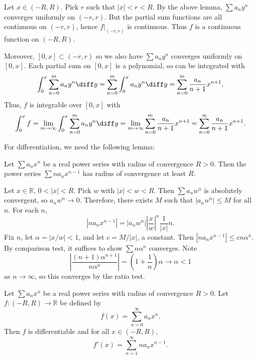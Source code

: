 \documentclass[12pt]{article}
\begin{document}
\begin{proofbox}
	Let $x \in (-R, R)$. Pick $r$ such that $|x| < r < R$. By the above lemma, $\sum a_n y^{n}$ converges uniformly on $(-r, r)$. But the partial sum functions are all continuous on $(-r, r)$, hence $f|_{(-r, r)}$ is continuous. Thus $f$ is a continuous function on $(-R, R)$.

	Moreover, $[0, x] \subset (-r, r)$ so we also have $\sum a_n y^{n}$ converges uniformly on $[0, x]$. Each partial sum on $[0, x]$ is a polynomial, so can be integrated with
	\[
		\int_{0}^{x} \sum_{n = 0}^{m} a_ny^{n}\diff y = \sum_{n = 0}^{m} \int_{0}^{x} a_n y^{n}\diff y = \sum_{n = 0}^{m} \frac{a_n}{n+1}x^{n+1}
	.\]
	Thus, $f$ is integrable over $[0, x]$ with
	\begin{align*}
		\int_{0}^{x} f = \lim_{m \to \infty}\int_{0}^{x} \sum_{n = 0}^{m} a_n y^{n}\diff y = \lim_{m \to \infty} \sum_{n = 0}^{m} \frac{a_n}{n+1}x^{n+1} = \sum_{n = 0}^{\infty} \frac{a_n}{n+1}x^{n+1}.
	\end{align*}
\end{proofbox}

For differentiation, we need the following lemma:

\begin{lemma}
	Let $\sum a_n x^{n}$ be a real power series with radius of convergence $R > 0$. Then the power series $\sum n a_n x^{n-1}$ has radius of convergence at least $R$.
\end{lemma}

\begin{proofbox}
	Let $x \in \mathbb{R}$, $0 < |x| < R$. Pick $w$ with $|x| < w < R$. Then $\sum a_n w^{n}$ is absolutely convergent, so $a_n w^{n} \to 0$. Therefore, there exists $M$ such that $|a_n w^{n}| \leq M$ for all $n$. For each $n$,
\[
|na_n x^{n-1}| = |a_n w^{n}| \left| \frac{x}{w} \right|^{n} \frac{1}{|x|}n
.\]
Fix $n$, let $\alpha = |x/w| < 1$, and let $c = M/|x|$, a constant. Then $|n a_n x^{n-1}| \leq c n \alpha^{n}$. By comparison test, it suffices to show $\sum n \alpha^{n}$ converges. Note
\[
	\left| \frac{(n+1)\alpha^{n+1}}{n \alpha^{n}} \right| = \left(1 + \frac{1}{n} \right) \alpha \to \alpha < 1
\]
as $n \to \infty$, so this converges by the ratio test.
\end{proofbox}


\begin{theorem}
	Let $\sum a_n x^{n}$ be a real power series with radius of convergence $R > 0$. Let $f : (-R, R) \to \mathbb{R}$ be defined by
	\[
		f(x) = \sum_{n = 0}^{\infty}a_n x^{n}
	.\]
	Then $f$ is differentiable and for all $x \in (-R, R)$,
	\[
		f'(x) = \sum_{n = 1}^{\infty}n a_n x^{n-1}
	.\]
\end{theorem}
\end{document}

